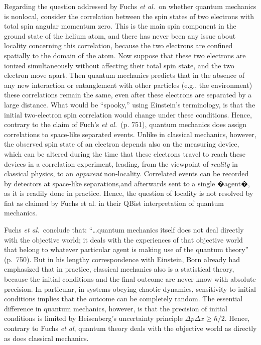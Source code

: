 \documentclass[prb,preprint]{revtex4-1}
\begin{document}
Regarding the question addressed by Fuchs {\it et al.\ }on whether quantum mechanics is nonlocal, consider the correlation between the spin states of two electrons with total spin angular momentum zero.  This is the main spin component 
in the ground state of the helium atom, and there has never been  any issue about locality concerning this correlation,  because the two electrons are confined spatially to the domain of the atom. Now suppose that these two electrons are ionized simultaneously without affecting their total spin state, and the two electron move apart. Then quantum mechanics predicts that in the absence of any new interaction or entanglement with other particles (e.g., the environment) these  correlations remain the same, even after these electrons are separated by a large distance.  What would  be ``spooky,'' using Einstein's terminology, is that the initial two-electron spin correlation would change under these conditions.  Hence, contrary to the claim of Fuch's {\it et al.\ }(p. 751), quantum mechanics  does  assign correlations to space-like separated events. Unlike in classical mechanics, however,  the observed spin state of an  electron depends also on the measuring device, which can be altered during the time that these electrons travel to  reach these devices in a correlation
experiment, leading, from the viewpoint of  {\it reality} in classical physics,  to an  {\it apparent} non-locality. Correlated events can be recorded by detectors at space-like separations,and afterwards sent to a single �agent�, as it is readily done in
practice. Hence, the question of locality is not resolved by fiat as  claimed by Fuchs et al. in their QBist interpretation of quantum mechanics.

 

Fuchs {\it et al.\ }conclude that: ``\dots quantum mechanics itself does not deal directly with the objective world; it deals with the experiences of that objective world that belong to whatever particular agent is making use of the quantum theory'' (p.~750).  But in his lengthy correspondence with Einstein, Born already had emphasized that in practice, classical mechanics also is a statistical theory, because the initial conditions and the final outcome are never know with absolute precision.\cite{born3}  In particular, in systems obeying chaotic dynamics, sensitivity to initial conditions implies that the outcome can be completely random.  The essential difference in quantum mechanics, however, is that  the precision of initial conditions is limited by Heisenberg's uncertainty principle $\Delta p \Delta x \geq \hbar/2$.   Hence, contrary to Fuchs {\it et al}, quantum theory deals with the objective world as  directly as does classical mechanics.
\end{document}
